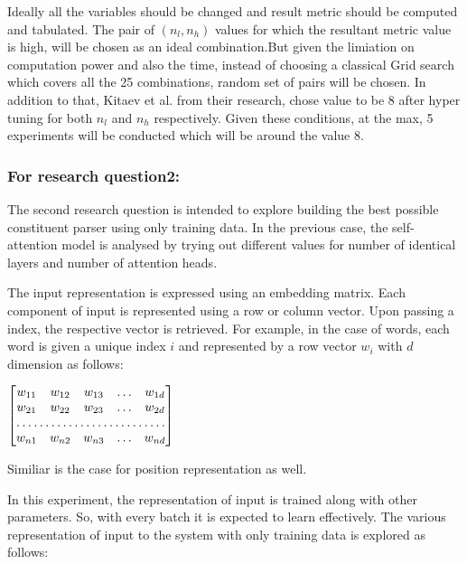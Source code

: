 \documentclass[a4paper, 11pt]{article}
\begin{document}
Ideally all the variables should be changed and result metric should be computed and tabulated. The pair of $(n_l,n_h)$ values for which the resultant metric value is high, will be chosen as an ideal combination.But given the limiation on computation power and also the time, instead of choosing a classical Grid search which covers all the 25 combinations, random set of pairs will be chosen. In addition to that, Kitaev et al. from their research, chose value to be 8 after hyper tuning for both $n_l$ and $n_h$ respectively. Given these conditions, at the max, 5 experiments will be conducted which will be around the value 8.

\subsubsection{For research question2:}

The second research question is intended to explore building the best possible constituent parser using only training data. In the previous case, the self-attention model is analysed by trying out different values for number of identical layers and number of attention heads. 

The input representation is expressed using an embedding matrix. Each component of input is represented using a row or column vector. Upon passing a index, the respective vector is retrieved. For example, in the case of words, each word is given a unique index $i$ and represented by a row vector $w_i$ with $d$ dimension as follows:

\begin{center}
$\begin{bmatrix}
    w_{11}       & w_{12} & w_{13} & \dots & w_{1d} \\
    w_{21}       & w_{22} & w_{23} & \dots & w_{2d} \\
    \hdotsfor{5} \\
    w_{n1}       & w_{n2} & w_{n3} & \dots & w_{nd}
\end{bmatrix}
$

\end{center}

Similiar is the case for position representation as well. 

In this experiment, the representation of input is trained along with other parameters. So, with every batch it is expected to learn effectively. The various representation of input to the system with only training data is explored as follows:
\end{document}
